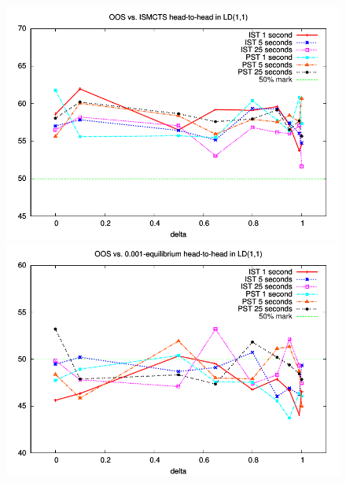 \documentclass[letterpaper]{article}
\newcommand{\defword}[1]{\textbf{\boldmath{#1}}}
\begin{document}
 
\begin{figure}[t!]
\begin{center}
\includegraphics[scale=0.5]{plots/ismcts-oos-perf} \\
\includegraphics[scale=0.5]{plots/eq-oos-perf} \\

\end{center}
\end{figure}
\end{document}

